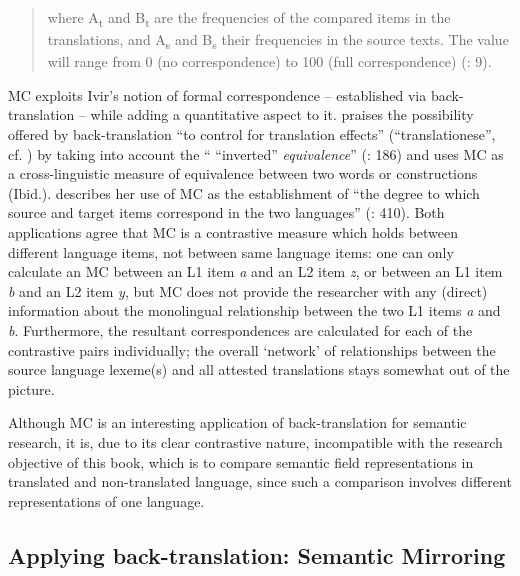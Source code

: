 \begin{quote}\end{quote}

\begin{quote}
where A\textsubscript{t} and B\textsubscript{t} are the frequencies of the compared items in the translations, and A\textsubscript{s} and B\textsubscript{s} their frequencies in the source texts. The value will range from 0 (no correspondence) to 100 (full correspondence) (\citealt{altenberg_correspondence_2007}: 9).
\end{quote}


MC exploits Ivir’s notion of formal correspondence – established via back-translation – while adding a quantitative aspect to it. \citet{de_los_angeles_gomez_gonzalez_causative_2008} praises the possibility offered by back-translation “to control for translation effects” (“translationese”, cf. \citealt{wollin_translationese_1986}) by taking into account the “ “inverted” \textit{equivalence}” (\citealt{de_los_angeles_gomez_gonzalez_causative_2008}: 186) and uses MC as a cross-linguistic measure of equivalence between two words or constructions (Ibid.). \citet{mortier_semantic_2010} describes her use of MC as the establishment of “the degree to which source and target items correspond in the two languages” (\citealt{mortier_semantic_2010}: 410). Both applications agree that MC is a contrastive measure which holds between different language items, not between same language items: one can only calculate an MC between an L1 item \textit{a} and an L2 item \textit{z}, or between an L1 item \textit{b} and an L2 item \textit{y}, but MC does not provide the researcher with any (direct) information about the monolingual relationship between the two L1 items \textit{a} and \textit{b}. Furthermore, the resultant correspondences are calculated for each of the contrastive pairs individually; the overall ‘network’ of relationships between the source language lexeme(s) and all attested translations stays somewhat out of the picture.



Although MC is an interesting application of back-translation for semantic research, it is, due to its clear contrastive nature, incompatible with the research objective of this book, which is to compare semantic field representations in translated and non-translated language, since such a comparison involves different representations of one language.


\subsection{\label{sec:2.3.4}  Applying back-translation: Semantic Mirroring}

